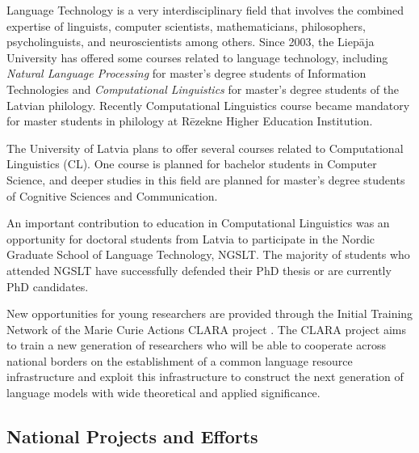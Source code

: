 \begin{multicols}{2}
Language Technology is a very interdisciplinary field that involves the combined expertise of linguists, computer scientists, mathematicians, philosophers, psycholinguists, and neuroscientists among others.
Since 2003, the Liepāja University has offered some courses related to language technology, including \textit{Natural Language Processing }for master's degree students of Information Technologies and \textit{Computational Linguistics} for master's degree students of the Latvian philology. 
Recently Computational Linguistics course became mandatory for master students in philology at Rēzekne Higher Education Institution.

The University of Latvia plans to offer several courses related to Computational Linguistics (CL).
One course is planned for bachelor students in Computer Science, and deeper studies in this field are planned for master's degree students of Cognitive Sciences and Communication.

An important contribution to education in Computational Linguistics was an opportunity for doctoral students from Latvia to participate in the Nordic Graduate School of Language Technology, NGSLT.
The majority of students who attended NGSLT have successfully defended their PhD thesis or are currently PhD candidates.

New opportunities for young researchers are provided through the Initial Training Network of the Marie Curie Actions CLARA project \cite{Meta38}.
The CLARA project aims to train a new generation of researchers who will be able to cooperate across national borders on the establishment of a common language resource infrastructure and exploit this infrastructure to construct the next generation of language models with wide theoretical and applied significance.

\subsection{National Projects and Efforts}


\end{multicols}
